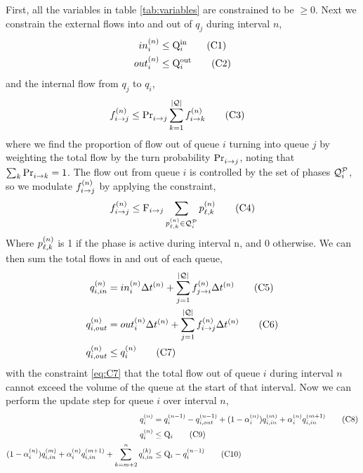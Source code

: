 First, all the variables in table \ref{tab:variables} are constrained to be $\ge 0$.
Next we constrain the external flows into and out of $q_j$ during interval $n$,
\begin{align}
\inq{i} &\le \QIN{i} \tag{C1}\label{eq:C1}\\        
\outq{i} &\le \QOUT{i} \tag{C2}\label{eq:C2}
\end{align}
and the internal flow from $q_j$ to $q_i$,
\begin{align}
\f{i}{j} &\le \FTURN{i}{j} \sum \limits_{k=1}^{\Qn}  \f{i}{k} \tag{C3}\label{eq:C3}
\end{align}
where we find the proportion of flow out of queue $i$ turning into queue $j$ by weighting the total flow by the turn probability $\FTURN{i}{j}$, noting that $\sum_k \FTURN{i}{k}=1$. The flow out from queue $i$ is controlled by the set of phases $\QPset{i}$, so we modulate $\f{i}{j}$ by applying the constraint,
\begin{align}
\f{i}{j} \le \FMAX{i}{j} \sum \limits_{\p{\ell}{k} \in \QPset{i}} {\p{\ell}{k}} \tag{C4}\label{eq:C4}
\end{align}
Where $\p{\ell}{k}$ is 1 if the phase is active during interval n, and 0 otherwise. We can then sum the total flows in and out of each queue,
\begin{align}
\qin{i} &= \inq{i} \DT + \sum \limits_{j=1}^{\Qn}  \f{j}{i} \DT   \tag{C5}\label{eq:C5} \\
\qout{i} &= \outq{i} \DT + \sum \limits_{j=1}^{\Qn}  \f{i}{j} \DT \tag{C6}\label{eq:C6}\\
\qout{i} &\le \q{i} \tag{C7}\label{eq:C7}
\end{align}
with the constraint \ref{eq:C7} that the total flow out of queue $i$ during interval $n$ cannot exceed the volume of the queue at the start of that interval.
Now we can perform the update step for queue $i$ over interval $n$,
\begin{align}
\q{i} &= \q[n-1]{i} - \qout[n-1]{i} + (1-\aph{i})\qin[m]{i} + \aph{i} \qin[m+1]{i} \tag{C8}\label{eq:C8}\\
\q{i} &\le \QMAX{i} \tag{C9}\label{eq:C9}\\
(1-\aph{i})\qin[m]{i} + \aph{i} \qin[m+1]{i} + \sum \limits_{k=m+2}^n \qin[k]{i} &\le \QMAX{i} - \q[n-1]{i}\tag{C10}\label{eq:C10}
\end{align}
